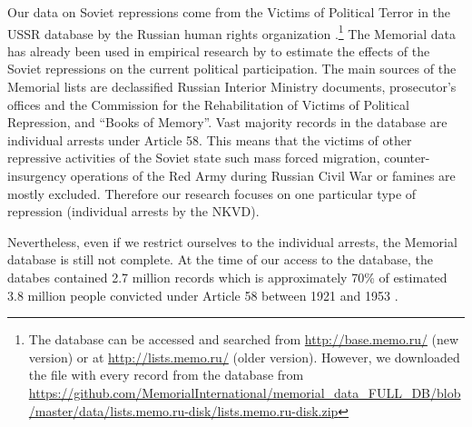 Our data on Soviet repressions come from  the Victims of Political Terror in the USSR database by the Russian human rights organization \citet{memorial_zhertvy_2017}.\footnote{The database can be accessed and searched from  \url{http://base.memo.ru/} (new version) or at \url{http://lists.memo.ru/} (older version). However, we downloaded the file with every record from the database from \url{https://github.com/MemorialInternational/memorial_data_FULL_DB/blob/master/data/lists.memo.ru-disk/lists.memo.ru-disk.zip}} 
The Memorial data has already been used in empirical research by \citet{zhukov_stalins_2018} to estimate the  effects of the Soviet repressions on the current political participation. 
 The main sources of the Memorial lists are declassified Russian Interior Ministry documents, prosecutor’s offices and the Commission for the Rehabilitation of Victims of Political Repression, and \enquote{Books of Memory}. 
Vast  majority records in the database are individual arrests under  Article 58. 
This means that the victims of other repressive activities of the Soviet state such mass forced migration, counter-insurgency operations of the Red Army during Russian Civil War or famines are mostly excluded. Therefore our research focuses on one  particular type of repression (individual arrests by the NKVD). 

Nevertheless, even if we restrict ourselves to the individual arrests, the Memorial database is still not complete.
At the time of our access to the database, the databes contained 2.7 million records which is approximately 70\% of estimated 3.8 million people convicted under Article 58 between 1921 and 1953 \citep{zhukov_stalins_2018}.



